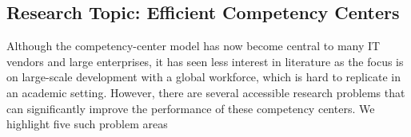 %
%

\subsection{Research Topic: Efficient Competency Centers}

Although the competency-center model has now become central to many IT vendors
and large enterprises, it has seen less interest in literature as the focus is
on large-scale development with a global workforce, which is hard to replicate
in an academic setting. However, there are several accessible research problems
that can significantly improve the performance of these competency centers. We
highlight five such problem areas


